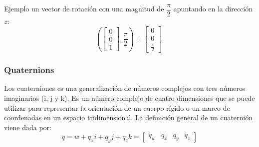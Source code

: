 \begin{frame}
Ejemplo un vector de rotación con una magnitud de $\dfrac{\pi}{2}$ apuntando en la dirección $z$:
    \begin{equation*}
        {\displaystyle {\left({\begin{bmatrix}0\\0\\1\end{bmatrix}},{\frac {\pi }{2}}\right) = \begin{bmatrix}0\\0\\{\frac {\pi }{2}}\end{bmatrix}}.}
    \end{equation*}


\end{frame}

\begin{frame}
    \frametitle{Quaternions}
    Los cuaterniones es una generalización de números complejos con tres números imaginarios (i, j y k). Es un número complejo de cuatro dimensiones que se puede utilizar para representar la orientación de un cuerpo rígido o un marco de coordenadas en un espacio tridimensional. La definición general de un cuaternión viene dada por:
    \begin{equation*}
        q = w + q_x i + q_y j + q_z k = \begin{bmatrix} q_w & q_x & q_y & q_z\end{bmatrix}
    \end{equation*}
\end{frame}

